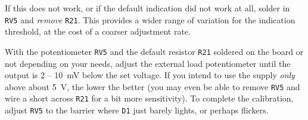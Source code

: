\documentclass[letterpaper,twocolumn,11pt]{article}
\newcommand{\refdes}[1]{\texttt{#1}}
\begin{document}
If this does not work, or if the default indication did not work at all, solder
in \refdes{RV5} and \emph{remove} \refdes{R21}. This provides a wider range of
variation for the indication threshold, at the cost of a coarser adjustment
rate.

With the potentiometer \refdes{RV5} and the default resistor \refdes{R21}
soldered on the board or not depending on your needs, adjust the external load
potentiometer until the output is 2 -- \SI{10}{\mV} below the set voltage. If
you intend to use the supply \emph{only} above about \SI{5}{\V}, the lower the
better (you may even be able to remove \refdes{RV5} and wire a short across
\refdes{R21} for a bit more sensitivity). To complete the calibration, adjust
\refdes{RV5} to the barrier where \refdes{D1} just barely lights, or perhaps
flickers.

\end{document}
